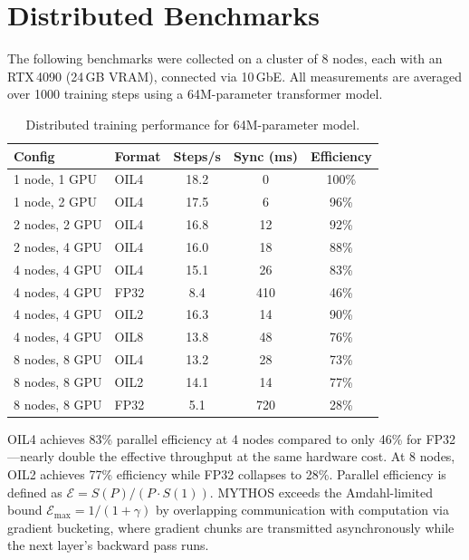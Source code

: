 \section{Distributed Benchmarks}
\label{sec:dist_benchmarks}

The following benchmarks were collected on a cluster of 8 nodes, each with an RTX\,4090 (24\,GB VRAM), connected via 10\,GbE. All measurements are averaged over 1000 training steps using a 64M-parameter transformer model.

\begin{table}[H]
\centering
\caption{Distributed training performance for 64M-parameter model.}
\label{tab:dist_benchmarks}
\begin{tabular}{llccc}
\toprule
\textbf{Config} & \textbf{Format} & \textbf{Steps/s} & \textbf{Sync (ms)} & \textbf{Efficiency} \\
\midrule
1 node, 1 GPU   & OIL4  & 18.2 &   0 & 100\% \\
1 node, 2 GPU   & OIL4  & 17.5 &   6 &  96\% \\
2 nodes, 2 GPU  & OIL4  & 16.8 &  12 &  92\% \\
2 nodes, 4 GPU  & OIL4  & 16.0 &  18 &  88\% \\
4 nodes, 4 GPU  & OIL4  & 15.1 &  26 &  83\% \\
4 nodes, 4 GPU  & FP32  &  8.4 & 410 &  46\% \\
4 nodes, 4 GPU  & OIL2  & 16.3 &  14 &  90\% \\
4 nodes, 4 GPU  & OIL8  & 13.8 &  48 &  76\% \\
8 nodes, 8 GPU  & OIL4  & 13.2 &  28 &  73\% \\
8 nodes, 8 GPU  & OIL2  & 14.1 &  14 &  77\% \\
8 nodes, 8 GPU  & FP32  &  5.1 & 720 &  28\% \\
\bottomrule
\end{tabular}
\end{table}

OIL4 achieves 83\% parallel efficiency at 4 nodes compared to only 46\% for FP32---nearly double the effective throughput at the same hardware cost. At 8 nodes, OIL2 achieves 77\% efficiency while FP32 collapses to 28\%. Parallel efficiency is defined as $\mathcal{E} = S(P) / (P \cdot S(1))$. MYTHOS exceeds the Amdahl-limited bound $\mathcal{E}_{\text{max}} = 1/(1+\gamma)$ by overlapping communication with computation via gradient bucketing, where gradient chunks are transmitted asynchronously while the next layer's backward pass runs.

